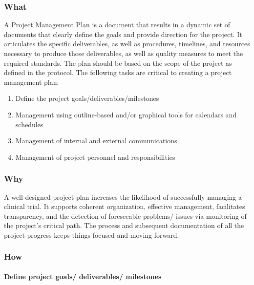 \documentclass[]{book}
\providecommand{\tightlist}{%
  \setlength{\itemsep}{0pt}\setlength{\parskip}{0pt}}
\theoremstyle{definition}
\theoremstyle{definition}
\theoremstyle{definition}
\theoremstyle{remark}
\begin{document}
\subsubsection{What}\label{what-18}

A Project Management Plan is a document that results in a dynamic set of
documents that clearly define the goals and provide direction for the
project. It articulates the specific deliverables, as well as
procedures, timelines, and resources necessary to produce those
deliverables, as well as quality measures to meet the required
standards. The plan should be based on the scope of the project as
defined in the protocol. The following tasks are critical to creating a
project management plan:

\begin{enumerate}
\def\labelenumi{\arabic{enumi}.}
\tightlist
\item
  Define the project goals/deliverables/milestones
\item
  Management using outline-based and/or graphical tools for calendars
  and schedules
\item
  Management of internal and external communications
\item
  Management of project personnel and responsibilities
\end{enumerate}

\subsubsection{Why}\label{why-18}

A well-designed project plan increases the likelihood of successfully
managing a clinical trial. It supports coherent organization, effective
management, facilitates transparency, and the detection of foreseeable
problems/ issues via monitoring of the project's critical path. The
process and subsequent documentation of all the project progress keeps
things focused and moving forward.

\subsubsection{How}\label{how-18}

\paragraph{Define project goals/ deliverables/
milestones}\label{define-project-goals-deliverables-milestones}
\end{document}
